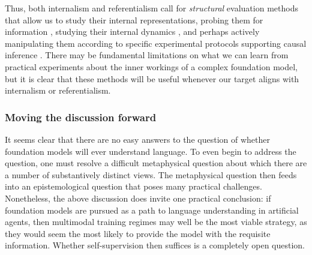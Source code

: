 Thus, both internalism and referentialism call for \textit{structural} evaluation methods that allow us to study their internal representations, probing them for information \citep{tenney2019bert, manning2020emergent}, studying their internal dynamics \citep{sundararajan2017axiomatic},  and perhaps actively manipulating them according to specific experimental protocols supporting causal inference \citep{vig2020causal, geiger-etal-2020-neural}. There may be fundamental limitations on what we can learn from practical experiments about the inner workings of a complex foundation model, but it is clear that these methods will be useful whenever our target aligns with internalism or referentialism.

\subsubsection{Moving the discussion forward}

It seems clear that there are no easy answers to the question of whether foundation models will ever understand language. To even begin to address the question, one must resolve a difficult metaphysical question about which there are a number of substantively distinct views. The metaphysical question then feeds into an epistemological question that poses many practical challenges. Nonetheless, the above discussion does invite one practical conclusion: if foundation models are pursued as a path to language understanding in artificial agents, then multimodal training regimes may well be the most viable strategy, as they would seem the most likely to provide the model with the requisite information. Whether self-supervision then suffices is a completely open question.

